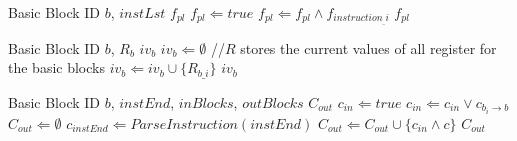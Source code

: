 \documentclass{article}
\begin{document}
\begin{algorithm}
\begin{algorithmic}[1]
\caption{Gen\_Block\_Prog\_Logic}
\REQUIRE Basic Block ID $b$, $instLst$
\ENSURE $f_{pl}$
\STATE $f_{pl} \Leftarrow true$
\STATE $f_{pl} \Leftarrow f_{pl} \wedge f_{instruction_\_i}$
\ENDIF
\ENDFOR
\RETURN $f_{pl}$
\end{algorithmic}
\end{algorithm}

\begin{algorithm}
\begin{algorithmic}[1]
\caption{Get\_Cur\_Reg\_Val}
\REQUIRE Basic Block ID $b$, $R_b$
\ENSURE $iv_b$
\STATE $iv_{b} \Leftarrow\emptyset$
\STATE //$R$ stores the current values of all register for the basic blocks
\STATE $iv_{b} \Leftarrow iv_{b} \cup \{R_{b\_i}\}$
\ENDFOR
\RETURN $iv_{b}$
\end{algorithmic}
\end{algorithm}

\begin{algorithm}
\begin{algorithmic}[1]
\caption{Gen\_Path\_Cond\_For\_Next\_Blocks}
\REQUIRE Basic Block ID $b$, $instEnd$, $inBlocks$, $outBlocks$
\ENSURE $C_{out}$
\STATE $c_{in} \Leftarrow true$
\STATE $c_{in} \Leftarrow c_{in} \vee c_{b_i \rightarrow b}$
\ENDFOR
\STATE $C_{out} \Leftarrow \emptyset$
\STATE $c_{instEnd} \Leftarrow Parse Instruction(instEnd)$
\STATE $C_{out} \Leftarrow C_{out} \cup \{c_{in} \wedge c\}$
\ENDFOR
\RETURN $C_{out}$
\end{algorithmic}
\end{algorithm}
\end{document}
